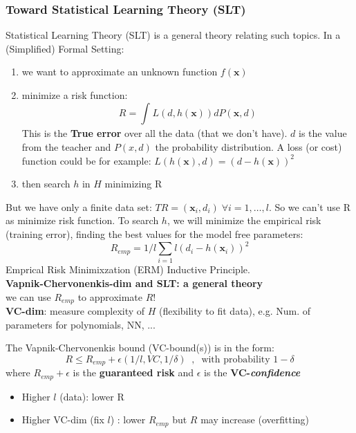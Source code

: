 \documentclass[../main.tex]{subfiles}
\begin{document}
\subsubsection{Toward Statistical Learning Theory (SLT)}
Statistical Learning Theory (SLT) is a general theory relating such topics. In a (Simplified) Formal Setting:
\begin{enumerate}
    \item we want to approximate an unknown function $f(\mathbf{x})$
    
    \item  minimize a risk function:
    $$  R = \int_{}^{} L(d, h(\mathbf{x}))dP(\mathbf{x},d)$$
    This is the \textbf{True error} over all the data (that we don't have). $d$ is the value from the teacher and $P(x,d)$ the probability distribution. A loss (or cost) function could be for example: $L(h(\mathbf{x}),d) = (d - h(\mathbf{x}))^2$
    
    \item then search $h$ in $H$ minimizing R
\end{enumerate}
But we have only a finite data set: $TR = (\mathbf{x}_i,d_i) \; \forall i = 1, \dots, l$. So we can't use R as minimize risk function. To search $h$, we will minimize the empirical risk (training error), finding the best values for the model free parameters:
$$ R_{emp} = 1/l \sum_{i = 1}{l}(d_i - h(\mathbf{x}_i))^2$$
Emprical Risk Minimixzation (ERM) Inductive Principle.\\


\noindent\textbf{Vapnik-Chervonenkis-dim and SLT: a general theory}\\
we can use $R_{emp}$ to approximate $R$!\\

\textbf{VC-dim}: measure complexity of $H$ (flexibility to fit data), e.g. Num. of parameters for polynomials, NN, ...

The Vapnik-Chervonenkis bound (VC-bound(s)) is in the form:
$$ R \leq R_{emp} + \epsilon(1/l, VC, 1/\delta)\;\; , \;\; \text{with probability } 1 - \delta$$
where $R_{emp} + \epsilon$ is the \textbf{guaranteed risk} and $\epsilon$ is the \textbf{VC-\textit{confidence}} 
\begin{itemize}
    \item Higher $l$ (data): lower R 
    \item Higher VC-dim (fix $l$) : lower $R_{emp}$ but $R$ may increase (overfitting)
\end{itemize}
\end{document}
